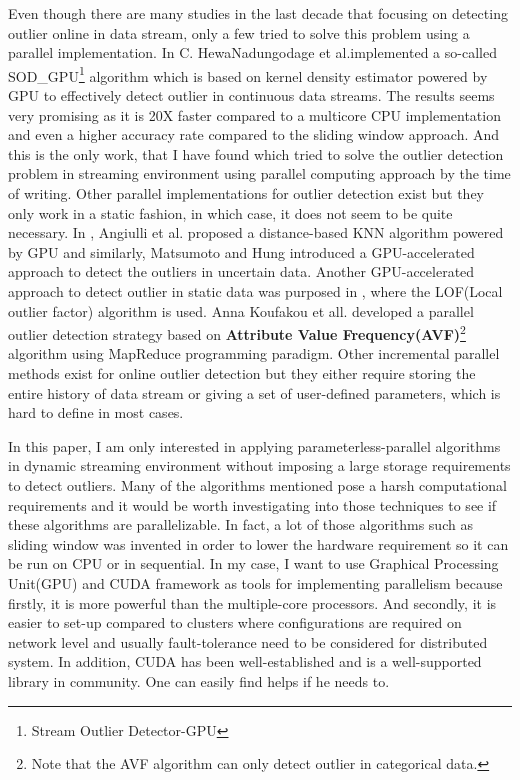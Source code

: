 \documentclass[11pt]{article}       %
\begin{document}
Even though there are many studies in the last decade that focusing on detecting outlier online in data stream, only a few tried to solve this problem using a parallel implementation. In \cite{7516110} C. HewaNadungodage et al.implemented a so-called SOD\_GPU\footnote{Stream Outlier Detector-GPU} algorithm which is based on kernel density estimator powered by GPU to effectively detect outlier in continuous data streams. The results seems very promising as it is 20X faster compared to a multicore CPU implementation and even a higher accuracy rate compared to the sliding window approach. And this is the only work, that I have found which tried to solve the outlier detection problem in streaming environment using parallel computing approach by the time of writing. Other parallel implementations for outlier detection exist but they only work in a static fashion, in which case, it does not seem to be quite necessary. In \cite{6641405},  Angiulli et al. proposed a distance-based KNN algorithm powered by GPU and similarly, Matsumoto and Hung\cite{Matsumoto2012} introduced a GPU-accelerated approach to detect the outliers in uncertain data. Another GPU-accelerated approach to detect outlier in static data was purposed in \cite{Alshawabkeh:2010:ALO:1735688.1735707}, where the LOF(Local outlier factor) algorithm is used. Anna Koufakou et all.\cite{4634266} developed a parallel outlier detection strategy based on \textbf{Attribute Value Frequency(AVF)}\cite{4410382}\footnote{Note that the AVF algorithm can only detect outlier in categorical data.} algorithm using MapReduce programming paradigm. Other incremental parallel methods exist for online outlier detection but they either require storing the entire history of data stream or giving a set of user-defined parameters, which is hard to define in most cases. 

In this paper, I am only interested in applying parameterless-parallel algorithms in dynamic streaming environment without imposing a large storage requirements to detect outliers. Many of the algorithms mentioned pose a harsh computational requirements and it would be worth investigating into those techniques to see if these algorithms are parallelizable. In fact, a lot of those algorithms such as sliding window was invented in order to lower the hardware requirement so it can be run on CPU or in sequential. In my case, I want to use Graphical Processing Unit(GPU) and CUDA framework as tools for implementing parallelism because firstly, it is more powerful than the multiple-core processors. And secondly, it is easier to set-up compared to clusters where configurations are required on network level and usually fault-tolerance need to be considered for distributed system. In addition, CUDA has been well-established and is a well-supported library in community. One can easily find helps if he needs to.




\end{document}
